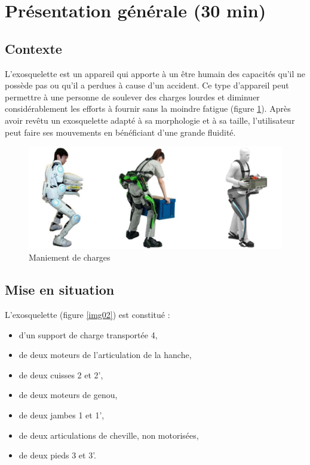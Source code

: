 

\section{Présentation générale (30 min)}

\subsection{Contexte}

L'exosquelette est un appareil qui apporte à un être humain des capacités qu'il ne possède pas ou qu'il a
perdues à cause d'un accident. Ce type d'appareil peut permettre à une personne de soulever des charges
lourdes et diminuer considérablement les efforts à fournir sans la moindre fatigue (figure \ref{img01}). Après avoir revêtu un exosquelette adapté à sa morphologie et à sa taille, l'utilisateur peut faire ses mouvements en bénéficiant d'une grande fluidité.

\begin{figure}[!h]
 \centering\includegraphics[width=0.9\linewidth]{img/fig01}
 \caption{Maniement de charges}
 \label{img01}
\end{figure}


\subsection{Mise en situation}

L'exosquelette (figure \ref{img02}) est constitué :
\begin{itemize}
 \item d'un support de charge transportée 4,
 \item de deux moteurs de l'articulation de la hanche,
 \item de deux cuisses 2 et 2',
 \item de deux moteurs de genou,
 \item de deux jambes 1 et 1',
 \item de deux articulations de cheville, non motorisées,
 \item de deux pieds 3 et 3'.
\end{itemize}

